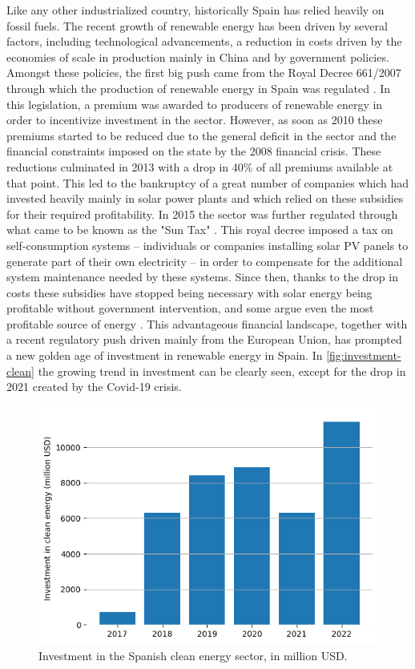 Like any other industrialized country, historically Spain has relied heavily on fossil fuels. The recent growth of renewable energy has been driven by several factors, including technological advancements, a reduction in costs driven by the economies of scale in production mainly in China and by government policies. Amongst these policies, the first big push came from the Royal Decree 661/2007 through which the production of renewable energy in Spain was regulated \cite{boe_661_2007}. In this legislation, a premium was awarded to producers of renewable energy in order to incentivize investment in the sector. However, as soon as 2010 these premiums started to be reduced due to the general deficit in the sector and the financial constraints imposed on the state by the 2008 financial crisis. These reductions culminated in 2013 with a drop in 40\% of all premiums available at that point. This led to the bankruptcy of a great number of companies which had invested heavily mainly in solar power plants and which relied on these subsidies for their required profitability. In 2015 the sector was further regulated through what came to be known as the "Sun Tax" \cite{boe_900_2015}. This royal decree imposed a tax on self-consumption systems -- individuals or companies installing solar PV panels to generate part of their own electricity -- in order to compensate for the additional system maintenance needed by these systems. Since then, thanks to the drop in costs these subsidies have stopped being necessary with solar energy being profitable without government intervention, and some argue even the most profitable source of energy \cite{gunther_glenk_reichelstein_2022}. This advantageous financial landscape, together with a recent regulatory push driven mainly from the European Union, has prompted a new golden age of investment in renewable energy in Spain. In \autoref{fig:investment-clean} the growing trend in investment can be clearly seen, except for the drop in 2021 created by the Covid-19 crisis. 

\begin{figure}[ht]
    \centering
    \captionsetup{justification=centering}
    \includegraphics[width=0.7\linewidth]{assets/investment-clean.png}
    \caption{Investment in the Spanish clean energy sector, in million USD. \cite{renewable_energy_investments_2022}}
    \label{fig:investment-clean}
\end{figure}

